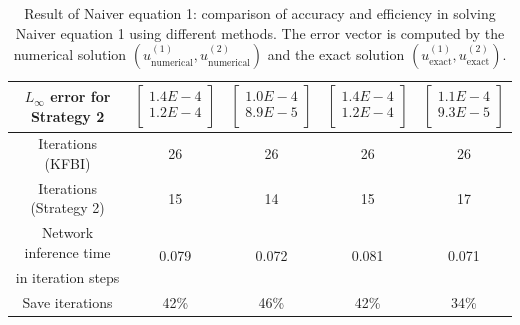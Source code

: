 \documentclass{article}
\begin{document}
\begin{table}[ht]
\begin{tabular}{|c|c|c|c|c|}
         $L_{\infty}$ error for Strategy 2 & $\begin{bmatrix}  1.4E-4\\ 1.2E-4\\ \end{bmatrix}$ 
         & $\begin{bmatrix}  1.0E-4\\ 8.9E-5\\ \end{bmatrix}$ 
         & $\begin{bmatrix}  1.4E-4\\ 1.2E-4\\ \end{bmatrix}$ 
         & $\begin{bmatrix}  1.1E-4\\ 9.3E-5\\ \end{bmatrix}$ \\ \hline
         Iterations (KFBI) & 26 & 26 & 26 & 26\\ \hline 
         Iterations (Strategy 2) & 15 & 14 & 15 &  17 \\ \hline 
         
         Network inference time
         & \multirow{2}{*}{0.079\bigstrut}
         & \multirow{2}{*}{0.072\bigstrut}
         & \multirow{2}{*}{0.081\bigstrut}
         & \multirow{2}{*}{0.071\bigstrut} \\
         in iteration steps & & & & \\ \hline
         
         Save iterations & 42\% & 46\% & 42\% & 34\% \\ \hline
    \end{tabular}
    \caption{Result of Naiver equation 1: comparison of accuracy and efficiency in solving Naiver equation 1 using different methods. The error vector is computed by the numerical solution $(u_{\mbox{numerical}}^{(1)}, u_{\mbox{numerical}}^{(2)})$ and the exact solution $(u_{\mbox{exact}}^{(1)}, u_{\mbox{exact}}^{(2)})$.}
    \label{label3_1_2}
\end{table}
\end{document}
